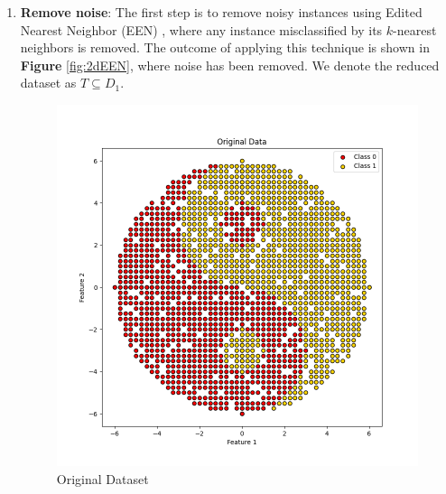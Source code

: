 \begin{enumerate}
	\item \textbf{Remove noise}: The first step is to remove noisy instances using Edited Nearest Neighbor (EEN) \cite{wilson1972asymptotic}, where any instance misclassified by its $ k $-nearest neighbors is removed. The outcome of applying this technique is shown in \textbf{Figure} \ref{fig:2dEEN}, where noise has been removed. We denote the reduced dataset as $ T \subseteq D_1 $.
	\begin{figure}[ht]
		\centering
		\begin{minipage}{0.45\textwidth}
			\centering
			\includegraphics[width=\textwidth]{figures/DROP3/2dDataset} %
			\caption{Original Dataset}
			\label{fig:2dDataset}
		\end{minipage}\hfill
		\begin{minipage}{0.45\textwidth}
			\centering

\end{minipage}
\end{figure}
\end{enumerate}
